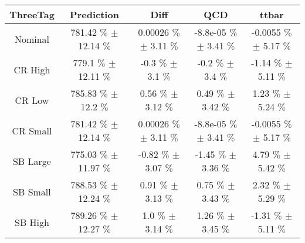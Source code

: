 \begin{footnotesize} 
\begin{tabular}{c|c|c|c|c} 
 ThreeTag & Prediction & Diff & QCD & ttbar \\ 
\hline\hline 
 
Nominal & 781.42 $\%$  $\pm$ 12.14 $\%$  & 0.00026 $\%$  $\pm$ 3.11 $\%$  & -8.8e-05 $\%$  $\pm$ 3.41 $\%$  & -0.0055 $\%$  $\pm$ 5.17 $\%$ \\ 
CR High & 779.1 $\%$  $\pm$ 12.11 $\%$  & -0.3 $\%$  $\pm$ 3.1 $\%$  & -0.2 $\%$  $\pm$ 3.4 $\%$  & -1.14 $\%$  $\pm$ 5.11 $\%$ \\ 
CR Low & 785.83 $\%$  $\pm$ 12.2 $\%$  & 0.56 $\%$  $\pm$ 3.12 $\%$  & 0.49 $\%$  $\pm$ 3.42 $\%$  & 1.23 $\%$  $\pm$ 5.24 $\%$ \\ 
CR Small & 781.42 $\%$  $\pm$ 12.14 $\%$  & 0.00026 $\%$  $\pm$ 3.11 $\%$  & -8.8e-05 $\%$  $\pm$ 3.41 $\%$  & -0.0055 $\%$  $\pm$ 5.17 $\%$ \\ 
SB Large & 775.03 $\%$  $\pm$ 11.97 $\%$  & -0.82 $\%$  $\pm$ 3.07 $\%$  & -1.45 $\%$  $\pm$ 3.36 $\%$  & 4.79 $\%$  $\pm$ 5.42 $\%$ \\ 
SB Small & 788.53 $\%$  $\pm$ 12.24 $\%$  & 0.91 $\%$  $\pm$ 3.13 $\%$  & 0.75 $\%$  $\pm$ 3.43 $\%$  & 2.32 $\%$  $\pm$ 5.29 $\%$ \\ 
SB High & 789.26 $\%$  $\pm$ 12.27 $\%$  & 1.0 $\%$  $\pm$ 3.14 $\%$  & 1.26 $\%$  $\pm$ 3.45 $\%$  & -1.31 $\%$  $\pm$ 5.11 $\%$ \\ 
 
\hline\hline 
\end{tabular} 
\end{footnotesize} 
\newline 
